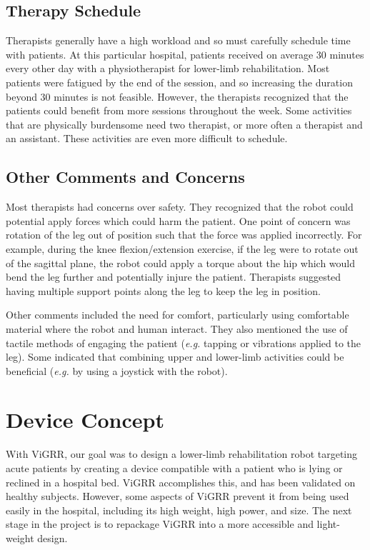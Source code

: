 \documentclass[12pt]{report}
\begin{document}
	\subsection{Therapy Schedule}
	
	Therapists generally have a high workload and so must carefully schedule time with patients. At this particular hospital, patients received on average 30 minutes every other day with a physiotherapist for lower-limb rehabilitation. Most patients were fatigued by the end of the session, and so increasing the duration beyond 30 minutes is not feasible. However, the therapists recognized that the patients could benefit from more sessions throughout the week. Some activities that are physically burdensome need two therapist, or more often a therapist and an assistant. These activities are even more difficult to schedule.
	
	\subsection{Other Comments and Concerns}
	
	Most therapists had concerns over safety. They recognized that the robot could potential apply forces which could harm the patient. One point of concern was rotation of the leg out of position such that the force was applied incorrectly. For example, during the knee flexion/extension exercise, if the leg were to rotate out of the sagittal plane, the robot could apply a torque about the hip which would bend the leg further and potentially injure the patient. Therapists suggested having multiple support points along the leg to keep the leg in position. 
	
	Other comments included the need for comfort, particularly using comfortable material where the robot and human interact. They also mentioned the use of tactile methods of engaging the patient (\textit{e.g.} tapping or vibrations applied to the leg). Some indicated that combining upper and lower-limb activities could be beneficial (\textit{e.g.} by using a joystick with the robot). 
	
	
\section{Device Concept} 

With ViGRR, our goal was to design a lower-limb rehabilitation robot targeting acute patients by creating a device compatible with a patient who is lying or reclined in a hospital bed. ViGRR accomplishes this, and has been validated on healthy subjects. However, some aspects of ViGRR prevent it from being used easily in the hospital, including its high weight, high power, and size. The next stage in the project is to repackage ViGRR into a more accessible and light-weight design. 
\end{document}
